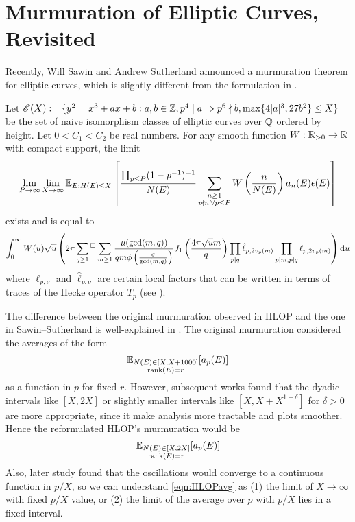 \section{Murmuration of Elliptic Curves, Revisited}
\label{sec:elliptic2}

Recently, Will Sawin and Andrew Sutherland announced a murmuration theorem for elliptic curves, which is slightly different from the formulation in \cite{he2024murmurations}.


\begin{theorem}
    \label{thm:sawin-sutherland}
    Let $\mathscr{E}(X) := \{y^2 = x^3 + ax + b: a, b \in \mathbb{Z}, p^4 \mid a \Rightarrow p^6 \nmid b, \max\{4|a|^3, 27 b^2\} \le X\}$ be the set of naive isomorphism classes of elliptic curves over $\mathbb{Q}$ ordered by height.
    Let $0 < C_1 < C_2$ be real numbers.
    For any smooth function $W : \mathbb{R}_{>0} \to \mathbb{R}$ with compact support, the limit
    \begin{equation}
        \lim_{P \to \infty }\lim_{X \to \infty} \mathbb{E}_{E : H(E) \le X} \left[ \frac{\prod_{p \le P}(1 - p^{-1})^{-1}}{N(E)} \sum_{\substack{n \ge 1 \\ p \nmid n \,\forall p \le P}} W\left(\frac{n}{N(E)}\right) a_n(E) \epsilon(E)\right]
    \end{equation}
    exists and is equal to
    \begin{equation}
        \int_{0}^{\infty} W(u) \sqrt{u} \left(2\pi \sideset{}{{}^\square}\sum_{q \ge 1} \sum_{m \ge 1} \frac{\mu(\gcd(m,q))}{qm \phi\left(\frac{q}{\gcd(m,q)}\right)} J_1 \left(\frac{4 \pi \sqrt{u}m}{q}\right) \prod_{p \mid q} \hat{\ell}_{p, 2v_p(m)} \prod_{p \mid m, p \nmid q} \ell_{p, 2v_p(m)} \right) \mathrm{d} u
    \end{equation}
    where $\ell_{p, \nu}$ and $\hat{\ell}_{p, \nu}$ are certain local factors that can be written in terms of traces of the Hecke operator $T_p$ (see \cite[Lemma 3, 4]{sawin2025murmurations}).
\end{theorem}

The difference between the original murmuration observed in HLOP \cite{he2024murmurations} and the one in Sawin--Sutherland is well-explained in \cite[Section 1.1]{sawin2025murmurations}.
The original murmuration considered the averages of the form 
\[
\mathbb{E}_{\substack{N(E) \in [X, X + 1000] \\ \mathrm{rank}(E) = r}} [a_p(E)]
\]
as a function in $p$ for fixed $r$.
However, subsequent works found that the dyadic intervals like $[X, 2X]$ or slightly smaller intervals like $[X, X + X^{1 - \delta}]$ for $\delta > 0$ are more appropriate, since it make analysis more tractable and plots smoother.
Hence the reformulated HLOP's murmuration would be
\begin{equation}
\label{eqn:HLOPavg}
\mathbb{E}_{\substack{N(E) \in [X, 2X] \\ \mathrm{rank}(E) = r}} [a_p(E)]
\end{equation}
Also, later study found that the oscillations would converge to a continuous function in $p / X$, so we can understand \eqref{eqn:HLOPavg} as (1) the limit of $X \to \infty$ with fixed $p / X$ value, or (2) the limit of the average over $p$ with $p / X$ lies in a fixed interval.

